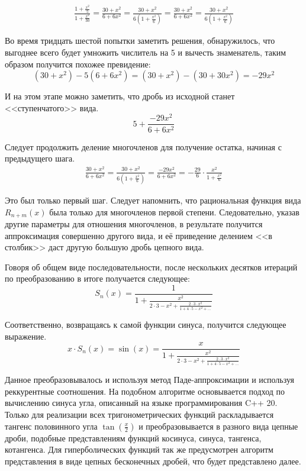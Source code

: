 \documentclass{article}
\begin{document}
    \begin{eqnarray*}
        \frac{1 + \frac{x^2}{5}}{1 + \frac{x^2}{30}} = 
        \frac{30 + x^2}{6 + 6x^2} = \frac{30 + x^2}{6(1 + \frac{x^2}{6})} = 
        \frac{30 + x^2}{6 + 6x^2} = \frac{30 + x^2}{6(1 + \frac{x^2}{6})}
    \end{eqnarray*}
    
    Во время тридцать шестой попытки заметить решения, обнаружилось, что
    выгоднее всего будет умножить числитель на 5 и вычесть знаменатель, 
    таким образом получится похожее превидение:
    $$(30 + x^2) - 5(6 + 6x^2) = (30 + x^2) - (30 + 30x^2) = -29x^2$$

    И на этом этапе можно заметить, что дробь из исходной станет <<ступенчатого>> вида.
    $$5 + \frac{-29x^2}{6 + 6x^2}$$
    
    Следует продолжить деление многочленов для получение остатка, начиная с предыдущего шага.
    \begin{eqnarray*}
        \frac{30 + x^2}{6 + 6x^2} = \frac{30 + x^2}{6(1 + \frac{x^2}{6})} =
        \frac{-29x^2}{6 + 6x^2} = -\frac{29}{6} \cdot \frac{x^2}{1 + \frac{x^2}{6}}
    \end{eqnarray*}
    
    Это был только первый шаг. Следует напомнить, что рациональная функция вида $R_{n+m}(x)$ была
    только для многочленов первой степени. Следовательно, указав другие параметры
    для отношения многочленов, в результате получится аппроксимация совершенно другого вида,
    и её приведение делением <<в столбик>> даст другую большую дробь цепного вида.
    
    Говоря об общем виде последовательности, после нескольких десятков 
    итераций по преобразованию в итоге получается следующее:
    $$S_n(x) = \frac{1}{1 + \frac{x^2}{2 \cdot 3 - x^2 + \frac{2 \cdot 3 \cdot x^2}{1 + 4 \cdot 5 - x^2 + \dots}}}$$
    
    Соответственно, возвращаясь к самой функции синуса, получится следующее выражение.
    $$x \cdot S_n(x) = \sin(x) = \frac{x}{1 + \frac{x^2}{2 \cdot 3 - x^2 + \frac{2 \cdot 3 \cdot x^2}{1 + 4 \cdot 5 - x^2 + \dots}}}$$

    Данное преобразовывалось и используя метод Паде-аппроксимации и используя реккурентные соотношения.
    На подобном алгоритме основывается подход по вычислению синуса угла, описанный на языке программирования C++ 20.
    Только для реализации всех тригонометрических функций раскладывается тангенс половинного угла $\tan(\frac{x}{2})$
    и преобразовывается в разного вида цепные дроби, подобные представлениям функций
    косинуса, синуса, тангенса, котангенса.
    Для гиперболических функций так же предусмотрен алгоритм представления
    в виде цепных бесконечных дробей, что будет представлено далее.
\end{document}
